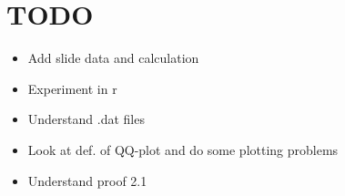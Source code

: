 \section{TODO}\par
\begin{itemize}
  \item Add slide data and calculation
  \item Experiment in r
  \item Understand .dat files
  \item Look at def. of QQ-plot and do some plotting problems
  \item Understand proof 2.1
\end{itemize}
